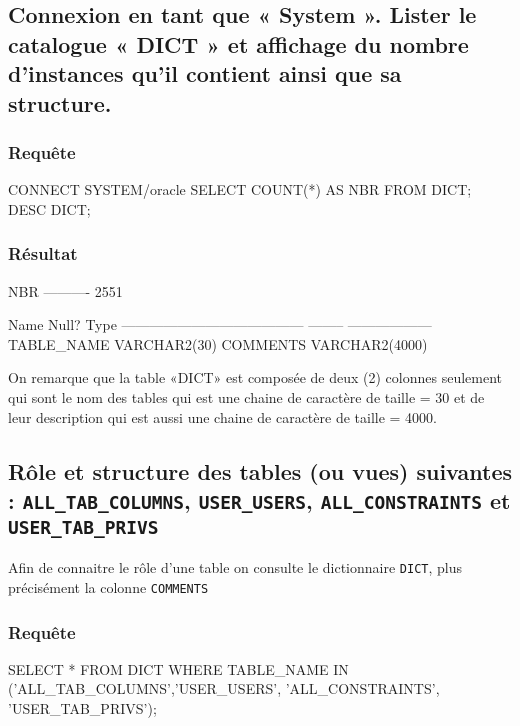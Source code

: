 \documentclass[•]{article}
\begin{document}
\def\reportnumber{3}
\def\reporttitle{Dictionnaire Oracle}


\subsection{Connexion en tant que « System ». Lister le catalogue « DICT » et affichage du nombre d’instances qu'il contient ainsi que sa structure.}

\subsubsection{Requête}
\begin{sql}
CONNECT SYSTEM/oracle
SELECT COUNT(*) AS NBR FROM DICT;
DESC DICT;
\end{sql}

\subsubsection{Résultat}
\begin{sql}
       NBR
----------
      2551

Name                                    Null?    Type
--------------------------------------- -------- ------------------
TABLE_NAME                                       VARCHAR2(30)
COMMENTS                                         VARCHAR2(4000)

\end{sql}
On remarque que la table «DICT» est composée de deux (2) colonnes seulement qui sont le nom des tables qui est une chaine de caractère de taille = 30 et de leur description qui est aussi une chaine de caractère de taille = 4000.

\subsection{Rôle et structure des tables (ou vues) suivantes : \texttt{ALL\_TAB\_COLUMNS},
\texttt{USER\_USERS}, \texttt{ALL\_CONSTRAINTS} et \texttt{USER\_TAB\_PRIVS}}
Afin de connaitre le rôle d'une table on consulte le dictionnaire \texttt{DICT}, plus précisément la colonne \texttt{COMMENTS}

\subsubsection{Requête}
\begin{sql}
SELECT * 
FROM DICT 
WHERE TABLE\_NAME IN ('ALL\_TAB\_COLUMNS','USER\_USERS', 'ALL\_CONSTRAINTS', 'USER\_TAB\_PRIVS');
\end{sql}
\end{document}
